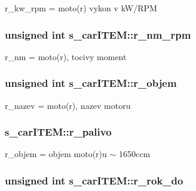 r\-\_\-kw\-\_\-rpm = moto(r) vykon v k\-W/\-R\-P\-M 

\hypertarget{structs__carITEM_a712a5a7cbd59dc84a426168f834da8a2}{
\subsubsection[{r\-\_\-nm\-\_\-rpm}]{\setlength{\rightskip}{0pt plus 5cm}unsigned int {\bf s\-\_\-car\-I\-T\-E\-M\-::r\-\_\-nm\-\_\-rpm}}}
\label{d7/da8/structs__carITEM_a712a5a7cbd59dc84a426168f834da8a2}


r\-\_\-nm = moto(r), tocivy moment 

\hypertarget{structs__carITEM_a02056de93d14dc2689a0b5bb3b991817}{
\subsubsection[{r\-\_\-objem}]{\setlength{\rightskip}{0pt plus 5cm}unsigned int {\bf s\-\_\-car\-I\-T\-E\-M\-::r\-\_\-objem}}}
\label{d7/da8/structs__carITEM_a02056de93d14dc2689a0b5bb3b991817}


r\-\_\-nazev = moto(r), nazev motoru 

\hypertarget{structs__carITEM_a381b61a73e3f24bf12eb8db98616d0e6}{
\subsubsection[{r\-\_\-palivo}]{ {\bf s\-\_\-car\-I\-T\-E\-M\-::r\-\_\-palivo}}}
\label{d7/da8/structs__carITEM_a381b61a73e3f24bf12eb8db98616d0e6}


r\-\_\-objem = objem moto(r)u $\sim$ 1650ccm 

\hypertarget{structs__carITEM_a2bdee748226e3ff73959a766dbd00315}{
\subsubsection[{r\-\_\-rok\-\_\-do}]{\setlength{\rightskip}{0pt plus 5cm}unsigned int {\bf s\-\_\-car\-I\-T\-E\-M\-::r\-\_\-rok\-\_\-do}}}
\label{d7/da8/structs__carITEM_a2bdee748226e3ff73959a766dbd00315}


